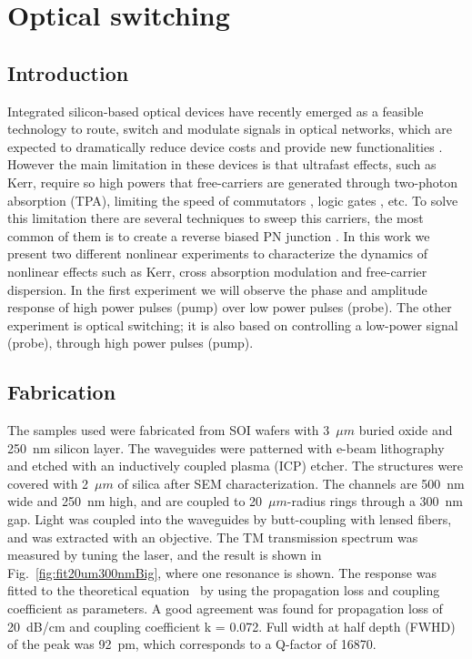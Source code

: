 \chapter{Optical switching}
\label{ch:switching}


\section{Introduction}
Integrated silicon-based optical devices have recently emerged as a feasible technology to route, switch and modulate signals in optical networks, which are expected to dramatically reduce device costs and provide new functionalities \cite{Soref2006}. However the main limitation in these devices is that ultrafast effects, such as Kerr, require so high powers that free-carriers are generated through two-photon absorption (TPA), limiting the speed of commutators \cite{Oton}, logic gates \cite{Oton2010}, etc.
To solve this limitation there are several techniques to sweep this carriers, the most common  of them is to create a reverse biased PN junction \cite{Turner-Foster2010}.
In this work we present two different nonlinear experiments to characterize the dynamics of nonlinear effects such as Kerr, cross absorption modulation and free-carrier dispersion. In the first experiment we will observe the phase and amplitude response of high power pulses (pump) over low power pulses (probe). The other experiment is optical switching; it is also based on controlling a low-power signal (probe), through high power pulses (pump).

 
\section{Fabrication}
The samples used were fabricated from SOI wafers with 3~$\mu m$ buried oxide and 250~nm silicon layer. The waveguides were patterned with e-beam lithography and etched with an inductively coupled plasma (ICP) etcher. The structures were covered with 2~$\mu m$ of silica after SEM characterization. The channels are 500~nm wide and 250~nm high, and are coupled to 20~$\mu m$-radius rings through a 300~nm gap. Light was coupled into the waveguides by butt-coupling with lensed fibers, and was extracted with an objective. The TM transmission spectrum was measured by tuning the laser, and the result is shown in Fig.~\ref{fig:fit20um300nmBig}, where one resonance is shown. The response was fitted to the theoretical equation~\cite{heebner2007optical} by using the propagation loss and coupling coefficient as parameters. A good agreement was found for propagation loss of 20~dB/cm and coupling coefficient k = 0.072. Full width at half depth (FWHD) of the peak was 92~pm, which corresponds to a Q-factor of 16870. 


